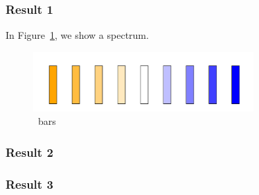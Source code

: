 \subsubsection{Result 1}

In Figure~\ref{fig:fig1}, we show a spectrum.

\begin{figure}[H]
  \centering
  \includegraphics[width=0.75\textwidth]{figures/fig1.png}
  \vspace{-.5em}
  \caption{\nbars~bars}
  \label{fig:fig1}
\end{figure}

\subsubsection{Result 2}
\subsubsection{Result 3}
